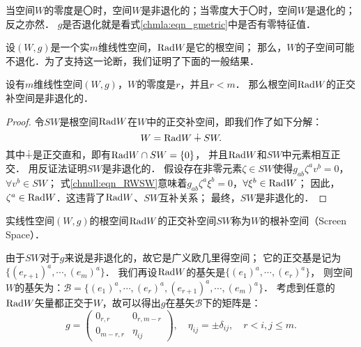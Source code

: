 
当空间$W$的零度是〇时，空间$W$是非退化的；当零度大于〇时，空间$W$是退化的；反之亦然．
$g$是否退化就是看式\eqref{chmla:eqn_gmetric}中是否有零特征值．


设$(W,g)$是一个实$m$维线性空间，${\rm Rad} W$是它的根空间；
那么，$W$的子空间可能不退化．为了支持这一论断，我们证明了下面的一般结果．

\begin{proposition}\label{chnull:thm_screen-radical}
    设有$m$维线性空间$(W,g)$，$W$的零度是$r$，并且$r<m$．
    那么根空间${\rm Rad} W$的正交补空间是非退化的．
\end{proposition}
\begin{proof}
    令$SW$是根空间${\rm Rad} W$在$W$中的正交补空间，即我们作了如下分解：
    \begin{equation}\label{chnull:eqn_RWSW}
        W = {\rm Rad} W \dotplus SW .
    \end{equation}
    其中$\dotplus$是正交直和，即有${\rm Rad} W \cap SW=\{0\}$，
    并且${\rm Rad} W $和$SW$中元素相互正交．
    用反证法证明$SW$是非退化的．
    假设存在非零元素$\zeta \in SW$使得$g_{ab} \zeta^a v^b=0$，$\forall v^b\in SW$；
    式\eqref{chnull:eqn_RWSW}意味着$g_{ab}\zeta^a \xi^b=0$，$\forall \xi^b \in {\rm Rad}W$；
    因此，$\zeta^a \in {\rm Rad}W$．这违背了${\rm Rad} W $、$SW$互补关系；
    最终，$SW$是非退化的．
\end{proof}

\begin{definition}
    实线性空间$(W,g)$的根空间${\rm Rad} W$的正交补空间$SW$称为$W$的{\heiti 根补空间}（Screen Space）．
\end{definition}


由于$SW$对于$g$来说是非退化的，故它是广义欧几里得空间；
它的正交基是记为$\{(e_{r+1})^a,\cdots,(e_m)^a\}$．
我们再设${\rm Rad}W$的基矢是$\{(e_1)^a,\cdots,(e_r)^a\}$，
则空间$W$的基矢为：$\mathcal{B}=\{(e_1)^a,\cdots,(e_r)^a,(e_{r+1})^a,\cdots,(e_m)^a\}$．
考虑到任意的${\rm Rad}W$矢量都正交于$W$，故可以得出$g$在基矢$\mathcal{B}$下的矩阵是：
\begin{equation}
    g=\begin{pmatrix}
        0_{r,r} & 0_{r,m-r} \\ 0_{m-r,r} &  \eta_{ij}
    \end{pmatrix},\quad
    \eta_{ij}=\pm \delta_{ij},\quad  r< i,j \leqslant m .
\end{equation}



